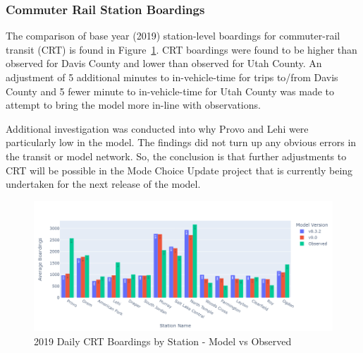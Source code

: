 \documentclass[
  letterpaper,
  DIV=11,
  numbers=noendperiod,
  titlepage=false]{scrreprt}
\begin{document}
\hypertarget{commuter-rail-station-boardings}{%
\subsubsection{Commuter Rail Station
Boardings}\label{commuter-rail-station-boardings}}

The comparison of base year (2019) station-level boardings for
commuter-rail transit (CRT) is found in Figure~\ref{fig-pdf-fr-brd}. CRT
boardings were found to be higher than observed for Davis County and
lower than observed for Utah County. An adjustment of 5 additional
minutes to in-vehicle-time for trips to/from Davis County and 5 fewer
minute to in-vehicle-time for Utah County was made to attempt to bring
the model more in-line with observations.

Additional investigation was conducted into why Provo and Lehi were
particularly low in the model. The findings did not turn up any obvious
errors in the transit or model network. So, the conclusion is that
further adjustments to CRT will be possible in the Mode Choice Update
project that is currently being undertaken for the next release of the
model.

\begin{figure}[H]

{\centering \includegraphics{v9x/v900/whats-new/_pictures/pdf-fr-brd.png}

}

\caption{\label{fig-pdf-fr-brd}2019 Daily CRT Boardings by Station -
Model vs Observed}

\end{figure}
\end{document}

